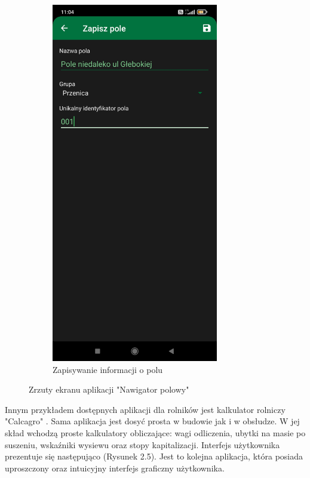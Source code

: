 \documentclass[a4paper,12pt,oneside]{book}
\begin{document}
\begin{figure}[H]
\begin{subfigure}{.5\textwidth}
			\includegraphics[width=0.8\textwidth]{grafika/nawigator_0.jpg}
			\caption{Zapisywanie informacji o polu}
		\end{subfigure}
		\caption{Zrzuty ekranu aplikacji "Nawigator polowy"}
	\end{figure}
	
	Innym przykładem dostępnych aplikacji dla rolników jest kalkulator rolniczy "Calcagro" \cite{ref7}. Sama aplikacja jest dosyć prosta w budowie jak i w obsłudze. W jej skład wchodzą proste kalkulatory obliczające: wagi odliczenia, ubytki na masie po suszeniu, wskaźniki wysiewu oraz stopy kapitalizacji. Interfejs użytkownika prezentuje się następująco (Rysunek 2.5). Jest to kolejna aplikacja, która posiada uproszczony oraz intuicyjny interfejs graficzny użytkownika.
	
\end{document}
